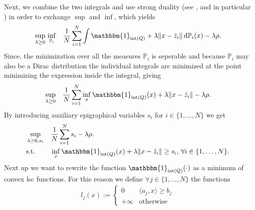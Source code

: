 \documentclass{scrartcl}
\newcommand*\diff{\mathop{}\!\mathrm{d}}
\renewcommand{\P}{\mathbb{P}}
\DeclareMathOperator*{\interior}{int}
\begin{document}
Next, we combine the two integrals and use strong duality (see
\cite{kuhn2015dd-dro-wasserstein}, and in particular \cite[Proposition 3.4]{shapiro2001duality}) in order to exchange $\sup$ and $\inf$, which yields
\begin{equation}
  \label{eq:reform_strong_duality}
  \begin{aligned}
   & \sup_{\lambda \ge 0} \, \inf_{\P_i}  & & \frac{1}{N} \sum_{i=1}^N \int \mathbbm{1}_{\interior(Q)} + \lambda \lVert x-\hat{z}_i \rVert \diff \P_i(x) - \lambda\rho. \\
  \end{aligned}
\end{equation}
Since, the minimization over all the measures $\P_i$ is seperable and because
$\P_i$ may also be a Dirac distribution the individual integrals are minimized at
the point minimizing the expression inside the integral, giving
\begin{equation}
  \label{eq:reform_pointwise_inf}
  \begin{aligned}
   & \sup_{\lambda \ge 0} & & \frac{1}{N} \sum_{i=1}^N \inf_{x} \mathbbm{1}_{\interior(Q)}(x) + \lambda \lVert x-\hat{z}_i \rVert - \lambda\rho. \\
  \end{aligned}
\end{equation}
By introducing auxiliary epigraphical variables $s_i$ for $i \in \{1,\dots,N\}$ we get
\begin{equation}
  \label{eq:reform_slack}
  \begin{aligned}
    & \sup_{\lambda \ge 0, s_i} & & \frac{1}{N} \sum_{i=1}^N s_i - \lambda\rho. \\
    & \text{s.t.} & & \inf_{x} \mathbbm{1}_{\interior(Q)}(x) + \lambda \lVert x-\hat{z}_i \rVert \geq s_i, \, \forall i \in \{1,\dots,N\}.
  \end{aligned}
\end{equation}
Next up we want to rewrite the function $\mathbbm{1}_{\interior(Q)}(\cdot)$ as a
minimum of convex lsc functions. For this reason we define $\forall j \in \{1,\dots,N\}$ the functions
\begin{equation}
  \begin{aligned}
   l_j(x) :=
   \begin{cases}
     0 & \langle {a_j, x} \rangle \geq b_j \\
     +\infty & \text{otherwise}
   \end{cases}
  \end{aligned}
\end{equation}
\end{document}
